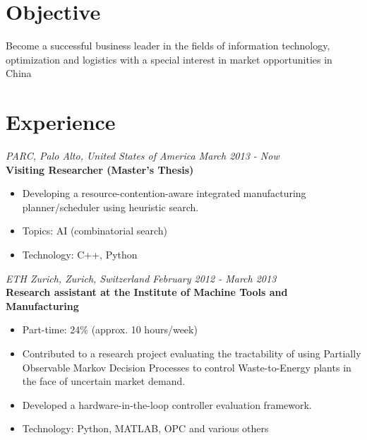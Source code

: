 \documentclass[margin]{res}
\begin{document}
 
 
 
\begin{resume} 
 
\section{Objective} 
Become a successful business leader in the fields of information technology, optimization and logistics with a special interest in market opportunities in China 
 
\section{Experience}

  {\it PARC, Palo Alto, United States of America \hfill March 2013 - Now} \\
  {\bf Visiting Researcher (Master's Thesis)}
  \begin{itemize} \itemsep -0.5pt 
  \item Developing a resource-contention-aware integrated manufacturing planner/scheduler using heuristic search.
  \item Topics: AI (combinatorial search)
  \item Technology: C++, Python
  \end{itemize}
  
  {\it ETH Zurich, Zurich, Switzerland \hfill February 2012 - March 2013} \\
  {\bf Research assistant at the Institute of Machine Tools and Manufacturing}
  \begin{itemize} \itemsep -0.5pt 
  \item Part-time: 24\% (approx. 10 hours/week)
  \item Contributed to a research project evaluating the tractability of using Partially Observable Markov Decision Processes to control Waste-to-Energy plants in the face of uncertain market demand.
  \item Developed a hardware-in-the-loop controller evaluation framework.
  \item Technology: Python, MATLAB, OPC and various others
  \end{itemize}
  

\end{resume}
\end{document}
